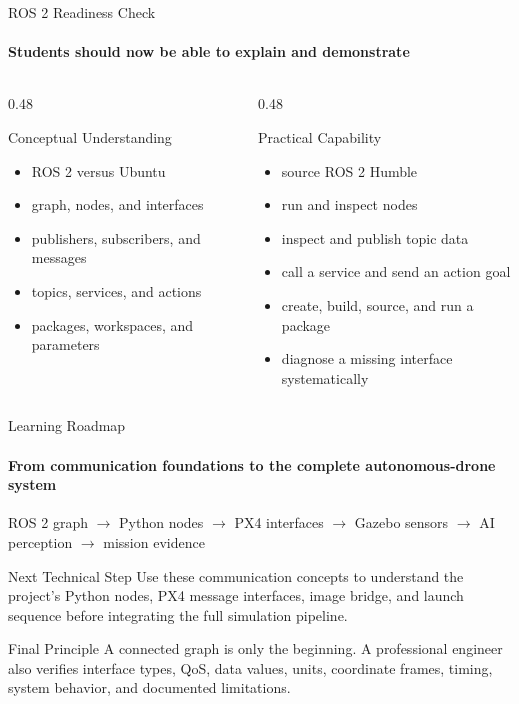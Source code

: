 \begin{frame}{ROS 2 Readiness Check}
\framesubtitle{Students should now be able to explain and demonstrate}
\footnotesize
\begin{columns}[T,onlytextwidth]
\begin{column}{0.48\textwidth}
\begin{block}{Conceptual Understanding}
\begin{itemize}
\item ROS 2 versus Ubuntu
\item graph, nodes, and interfaces
\item publishers, subscribers, and messages
\item topics, services, and actions
\item packages, workspaces, and parameters
\end{itemize}
\end{block}
\end{column}
\begin{column}{0.48\textwidth}
\begin{exampleblock}{Practical Capability}
\begin{itemize}
\item source ROS 2 Humble
\item run and inspect nodes
\item inspect and publish topic data
\item call a service and send an action goal
\item create, build, source, and run a package
\item diagnose a missing interface systematically
\end{itemize}
\end{exampleblock}
\end{column}
\end{columns}
\end{frame}

\begin{frame}{Learning Roadmap}
\framesubtitle{From communication foundations to the complete autonomous-drone system}
\begin{center}
ROS 2 graph
$\rightarrow$
Python nodes
$\rightarrow$
PX4 interfaces
$\rightarrow$
Gazebo sensors
$\rightarrow$
AI perception
$\rightarrow$
mission evidence
\end{center}
\begin{exampleblock}{Next Technical Step}
Use these communication concepts to understand the project's Python nodes, PX4 message interfaces, image bridge, and launch sequence before integrating the full simulation pipeline.
\end{exampleblock}
\begin{alertblock}{Final Principle}
A connected graph is only the beginning. A professional engineer also verifies interface types, QoS, data values, units, coordinate frames, timing, system behavior, and documented limitations.
\end{alertblock}
\end{frame}

